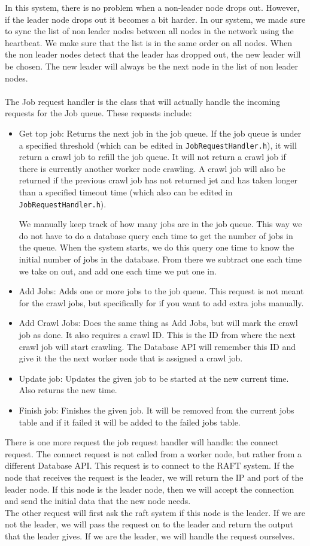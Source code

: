\documentclass[../Main.tex]{subfiles}
\begin{document}
In this system, there is no problem when a non-leader node drops out. However, if the leader node drops out it becomes a bit harder. In our system, we made sure to sync the list of non leader nodes between all nodes in the network using the heartbeat. We make sure that the list is in the same order on all nodes. When the non leader nodes detect that the leader has dropped out, the new leader will be chosen. The new leader will always be the next node in the list of non leader nodes.\\\\
The Job request handler is the class that will actually handle the incoming requests for the Job queue. These requests include:
\begin{itemize}
    \item Get top job: Returns the next job in the job queue. If the job queue is under a specified threshold (which can be edited in \texttt{JobRequestHandler.h}), it will return a crawl job to refill the job queue. It will not return a crawl job if there is currently another worker node crawling. A crawl job will also be returned if the previous crawl job has not returned jet and has taken longer than a specified timeout time (which also can be edited in \texttt{JobRequestHandler.h}).
    
    We manually keep track of how many jobs are in the job queue. This way we do not have to do a database query each time to get the number of jobs in the queue. When the system starts, we do this query one time to know the initial number of jobs in the database. From there we subtract one each time we take on out, and add one each time we put one in. 
    \item Add Jobs: Adds one or more jobs to the job queue. This request is not meant for the crawl jobs, but specifically for if you want to add extra jobs manually.
    \item Add Crawl Jobs: Does the same thing as Add Jobs, but will mark the crawl job as done. It also requires a crawl ID. This is the ID from where the next crawl job will start crawling. The Database API will remember this ID and give it the the next worker node that is assigned a crawl job.
    \item Update job: Updates the given job to be started at the new current time. Also returns the new time.
    \item Finish job: Finishes the given job. It will be removed from the current jobs table and if it failed it will be added to the failed jobs table.
\end{itemize}
There is one more request the job request handler will handle: the connect request. The connect request is not called from a worker node, but rather from a different Database API. This request is to connect to the RAFT system. If the node that receives the request is the leader, we will return the IP and port of the leader node. If this node is the leader node, then we will accept the connection and send the initial data that the new node needs.\\

The other request will first ask the raft system if this node is the leader. If we are not the leader, we will pass the request on to the leader and return the output that the leader gives. If we are the leader, we will handle the request ourselves. 
\end{document}
